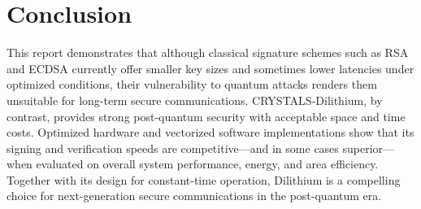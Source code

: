 \documentclass{article}
\begin{document}
\section{Conclusion}
This report demonstrates that although classical signature schemes such as RSA and ECDSA currently offer smaller key sizes and sometimes lower latencies under optimized conditions, their vulnerability to quantum attacks renders them unsuitable for long-term secure communications. CRYSTALS-Dilithium, by contrast, provides strong post-quantum security with acceptable space and time costs. Optimized hardware and vectorized software implementations show that its signing and verification speeds are competitive—and in some cases superior—when evaluated on overall system performance, energy, and area efficiency. Together with its design for constant-time operation, Dilithium is a compelling choice for next-generation secure communications in the post-quantum era.
\end{document}
